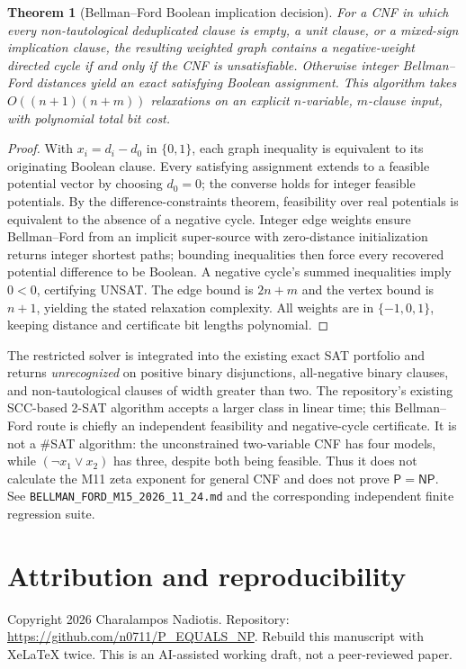 \documentclass[11pt,a4paper]{article}
\newtheorem{theorem}{Theorem}
\begin{document}
\begin{theorem}[Bellman--Ford Boolean implication decision]
For a CNF in which every non-tautological deduplicated clause is
empty, a unit clause, or a mixed-sign implication clause,
the resulting weighted graph contains a negative-weight directed
cycle if and only if the CNF is unsatisfiable.
Otherwise integer Bellman--Ford distances yield an exact
satisfying Boolean assignment.
This algorithm takes $O((n+1)(n+m))$ relaxations on an explicit
$n$-variable, $m$-clause input, with polynomial total bit cost.
\end{theorem}
\begin{proof}
With $x_i=d_i-d_0$ in $\{0,1\}$, each graph inequality
is equivalent to its originating Boolean clause. Every
satisfying assignment extends to a feasible potential vector
by choosing $d_0=0$; the converse holds for integer feasible
potentials. By the difference-constraints theorem, feasibility
over real potentials is equivalent to the absence of a negative
cycle. Integer edge weights ensure Bellman--Ford from an
implicit super-source with zero-distance initialization
returns integer shortest paths; bounding inequalities then
force every recovered potential difference to be Boolean.
A negative cycle's summed inequalities imply $0<0$,
certifying UNSAT. The edge bound is $2n+m$ and the vertex
bound is $n+1$, yielding the stated relaxation complexity.
All weights are in $\{-1,0,1\}$, keeping distance and
certificate bit lengths polynomial.
\end{proof}

The restricted solver is integrated into the existing exact
SAT portfolio and returns \emph{unrecognized} on positive
binary disjunctions, all-negative binary clauses, and
non-tautological clauses of width greater than two.
The repository's existing SCC-based 2-SAT algorithm accepts a
larger class in linear time; this Bellman--Ford route is
chiefly an independent feasibility and negative-cycle
certificate. It is not a \#SAT algorithm: the unconstrained
two-variable CNF has four models, while
$(\neg x_1\lor x_2)$ has three, despite both being feasible.
Thus it does not calculate the M11 zeta exponent for
general CNF and does not prove $\mathsf P=\mathsf{NP}$.
See \texttt{BELLMAN\_FORD\_M15\_2026\_11\_24.md}
and the corresponding independent finite regression suite.

\section*{Attribution and reproducibility}
Copyright 2026 Charalampos Nadiotis.
Repository: \url{https://github.com/n0711/P_EQUALS_NP}.
Rebuild this manuscript with XeLaTeX twice. This is an
AI-assisted working draft, not a peer-reviewed paper.
\end{document}
